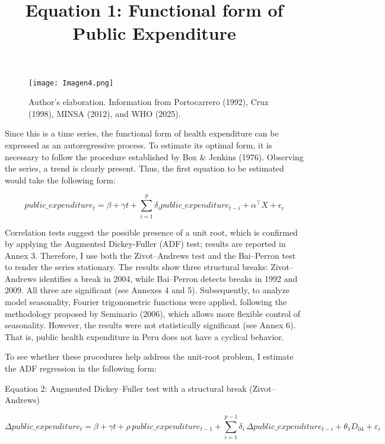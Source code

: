\documentclass[12pt]{article}
\begin{document}
\bigskip
\bigskip
\bigskip

\begin{figure}[H]
\par\vspace{0.8em}
\texttt{[image: Imagen4.png]}

{\footnotesize Author’s elaboration. Information from Portocarrero (1992), Cruz (1998), MINSA (2012), and WHO (2025).}
\end{figure}

Since this is a time series, the functional form of health expenditure can be expressed as an autoregressive process. To estimate its optimal form, it is necessary to follow the procedure established by Box \& Jenkins (1976). Observing the series, a trend is clearly present. Thus, the first equation to be estimated would take the following form:

\begin{center}
\title{Equation 1: Functional form of Public Expenditure}
\end{center}
\begin{equation}
public\_expenditure_{t}= \beta + \gamma t + \sum_{i=1}^{p} \delta_{i}public\_expenditure_{t-i} + \alpha^{\top} X + \epsilon_{i}
\end{equation}

Correlation tests suggest the possible presence of a unit root, which is confirmed by applying the Augmented Dickey-Fuller (ADF) test; results are reported in Annex 3. Therefore, I use both the Zivot–Andrews test and the Bai–Perron test to render the series stationary. The results show three structural breaks: Zivot–Andrews identifies a break in 2004, while Bai–Perron detects breaks in 1992 and 2009. All three are significant (see Annexes 4 and 5). Subsequently, to analyze model seasonality, Fourier trigonometric functions were applied, following the methodology proposed by Seminario (2006), which allows more flexible control of seasonality. However, the results were not statistically significant (see Annex 6). That is, public health expenditure in Peru does not have a cyclical behavior.

To see whether these procedures help address the unit-root problem, I estimate the ADF regression in the following form:

\begin{center}
Equation 2: Augmented Dickey–Fuller test with a structural break (Zivot–Andrews)
\end{center}
\begin{equation}
\Delta public\_expenditure_{t} = \beta + \gamma t + \rho \, public\_expenditure_{t-1} + \sum_{i=1}^{p-1} \delta_{i} \, \Delta public\_expenditure_{t-i} + \theta_{1} D_{04} + \varepsilon_{i}
\end{equation}
\end{document}
